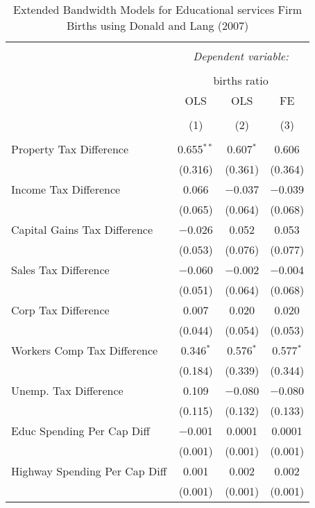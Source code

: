 
\begin{table}[!htbp] \centering 
  \caption{Extended Bandwidth Models for  Educational services Firm Births using Donald and Lang (2007)} 
  \label{} 
\begin{tabular}{@{\extracolsep{5pt}}lccc} 
\\[-1.8ex]\hline 
\hline \\[-1.8ex] 
 & \multicolumn{3}{c}{\textit{Dependent variable:}} \\ 
\cline{2-4} 
\\[-1.8ex] & \multicolumn{3}{c}{births ratio} \\ 
 & OLS & OLS & FE \\ 
\\[-1.8ex] & (1) & (2) & (3)\\ 
\hline \\[-1.8ex] 
 Property Tax Difference & 0.655$^{**}$ & 0.607$^{*}$ & 0.606 \\ 
  & (0.316) & (0.361) & (0.364) \\ 
  Income Tax Difference & 0.066 & $-$0.037 & $-$0.039 \\ 
  & (0.065) & (0.064) & (0.068) \\ 
  Capital Gains Tax Difference & $-$0.026 & 0.052 & 0.053 \\ 
  & (0.053) & (0.076) & (0.077) \\ 
  Sales Tax Difference & $-$0.060 & $-$0.002 & $-$0.004 \\ 
  & (0.051) & (0.064) & (0.068) \\ 
  Corp Tax Difference & 0.007 & 0.020 & 0.020 \\ 
  & (0.044) & (0.054) & (0.053) \\ 
  Workers Comp Tax Difference & 0.346$^{*}$ & 0.576$^{*}$ & 0.577$^{*}$ \\ 
  & (0.184) & (0.339) & (0.344) \\ 
  Unemp. Tax Difference & 0.109 & $-$0.080 & $-$0.080 \\ 
  & (0.115) & (0.132) & (0.133) \\ 
  Educ Spending Per Cap Diff & $-$0.001 & 0.0001 & 0.0001 \\ 
  & (0.001) & (0.001) & (0.001) \\ 
  Highway Spending Per Cap Diff & 0.001 & 0.002 & 0.002 \\ 
  & (0.001) & (0.001) & (0.001) \\ 

\end{tabular}
\end{table}
